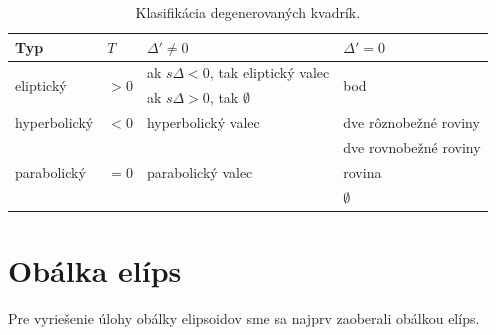 
\begin{table}[h]
\centering
\begin{tabular}{|l|l|l|l|}
\hline
Typ & $T$ & $\Delta' \neq  0$ & $\Delta' = 0 $ \\
\hline
\multirow{2}{*}{eliptický} & \multirow{2}{*}{$> 0$} & ak $s\Delta < 0$, tak eliptický valec & \multirow{2}{*}{bod} \\
& & ak $s\Delta > 0$, tak $\emptyset$ &\\
\hline
hyperbolický & $< 0$ & hyperbolický valec & dve rôznobežné roviny \\
\hline
\multirow{3}{*}{parabolický} & \multirow{3}{*}{$= 0$} & \multirow{3}{*}{parabolický valec} & dve rovnobežné roviny \\
& & & rovina \\
& & & $\emptyset$ \\
\hline
\end{tabular}
\caption{Klasifikácia degenerovaných kvadrík.}
\label{tab:degenerate_quadrics}
\end{table}

\section{Obálka elíps}
Pre vyriešenie úlohy obálky elipsoidov sme sa najprv zaoberali obálkou elíps.
